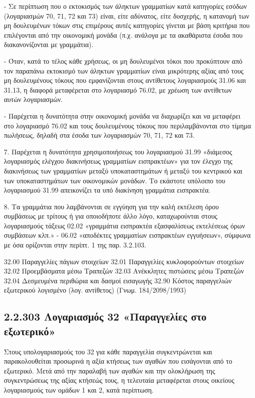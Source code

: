 \documentclass[A4,10pt,greek]{book}
\begin{document}
- Σε περίπτωση που ο εκτοκισμός των άληκτων γραμματίων κατά κατηγορίες εσόδων (λογαριασμών 70, 71, 72 και 73) είναι, είτε αδύνατος, είτε δυσχερής, η κατανομή των μη δουλευμένων τόκων στις επιμέρους αυτές κατηγορίες γίνεται με βάση κριτήρια που επιλέγονται από την οικονομική μονάδα (π.χ. ανάλογα με τα ακαθάριστα έσοδα που διακανονίζονται με γραμμάτια).

- Όταν, κατά το τέλος κάθε χρήσεως, οι μη δουλευμένοι τόκοι που προκύπτουν από τον παραπάνω εκτοκισμό των άληκτων γραμματίων είναι μικρότερης αξίας από τους μη δουλευμένους τόκους που εμφανίζονται στους αντίθετους λογαριασμούς 31.06 και 31.13, η διαφορά μεταφέρεται στο λογαριασμό 76.02, με χρέωση των αντίθετων αυτών λογαριασμών.

- Παρέχεται η δυνατότητα στην οικονομική μονάδα να διαχωρίζει και να μεταφέρει στο λογαριασμό 76.02 και τους δουλευμένους τόκους που περιλαμβάνονται στο τίμημα πωλήσεως, δηλαδή στα έσοδα των λογαριασμών 70, 71, 72 και 73.

7. Παρέχεται η δυνατότητα χρησιμοποιήσεως του λογαριασμού 31.99 «διάμεσος λογαριασμός ελέγχου διακινήσεως γραμματίων εισπρακτέων» για τον έλεγχο της διακινήσεως των γραμματίων μεταξύ υποκαταστημάτων ή μεταξύ του κεντρικού και των υποκαταστημάτων των οικονομικών μονάδων. Το εκάστοτε υπόλοιπο του λογαριασμού 31.99 απεικονίζει τα υπό διακίνηση γραμμάτια εισπρακτέα.

8. Τα γραμμάτια που λαμβάνονται σε εγγύηση για την καλή εκτέλεση όρου συμβάσεως με τρίτους ή για οποιοδήποτε άλλο λόγο, καταχωρούνται στους λογαριασμούς τάξεως 02.02 «γραμμάτια εισπρακτέα εξασφαλίσεως εκτελέσεως όρων συμβάσεων κλπ.» - 06.02 «αποδέκτες γραμματίων εισπρακτέων εγγυήσεων», σύμφωνα με όσα ορίζονται στην περίπτ. 1 της παρ. 3.2.103.


32.00   Παραγγελίες πάγιων στοιχείων
32.01   Παραγγελίες κυκλοφορούντων στοιχείων
32.02   Προεμβάσματα μέσω Τραπεζών
32.03   Ανέκκλητες πιστώσεις μέσω Τραπεζών
32.04   Δεσμευμένα περιθώρια και δασμοί εισαγωγής
32.90   Κόστος παραγγελιών εξωτερικού λογισμένο (λογ. αντίθετος) (Γνωμ. 184/2098/1993)


\subsection{2.2.303 Λογαριασμός 32 «Παραγγελίες στο εξωτερικό»}

Στους υπολογαριασμούς του 32 για κάθε παραγγελία συγκεντρώνεται και παρακολουθείται προσωρινά η αξία κτήσεως των αγαθών που εισάγονται από το εξωτερικό. Μετά από την παραλαβή των αγαθών και την ολοκλήρωση της συγκεντρώσεως της αξίας κτήσεώς τους, η τελευταία μεταφέρεται στους οικείους λογαριασμούς των ομάδων 1 και 2, κατά περίπτωση.
\end{document}
